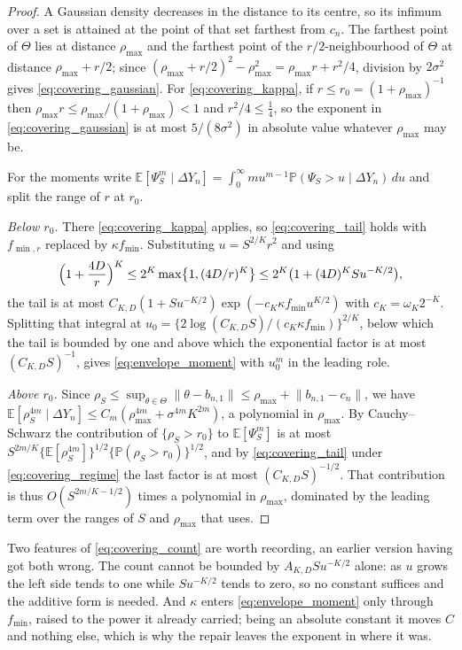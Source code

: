 \documentclass[11pt]{article}
\theoremstyle{definition}
\newcommand{\E}{\mathbb{E}}
\newcommand{\Pp}{\mathbb{P}}
\begin{document}
\begin{proof}
A Gaussian density decreases in the distance to its centre, so its infimum over a set is attained at the point of that set farthest from $c_n$. The farthest point of $\Theta$ lies at distance $\rho_{\max}$ and the farthest point of the $r/2$-neighbourhood of $\Theta$ at distance $\rho_{\max}+r/2$; since $(\rho_{\max}+r/2)^2-\rho_{\max}^2=\rho_{\max}r+r^2/4$, division by $2\sigma^2$ gives \eqref{eq:covering_gaussian}. For \eqref{eq:covering_kappa}, if $r\le r_0=(1+\rho_{\max})^{-1}$ then $\rho_{\max}r\le\rho_{\max}/(1+\rho_{\max})<1$ and $r^2/4\le\tfrac14$, so the exponent in \eqref{eq:covering_gaussian} is at most $5/(8\sigma^2)$ in absolute value whatever $\rho_{\max}$ may be.

For the moments write $\E[\Psi_S^m\mid\Delta Y_n]=\int_0^\infty mu^{m-1}\Pp(\Psi_S>u\mid\Delta Y_n)\,du$ and split the range of $r$ at $r_0$.

\emph{Below $r_0$.} There \eqref{eq:covering_kappa} applies, so \eqref{eq:covering_tail} holds with $f_{\min,r}$ replaced by $\kappa f_{\min}$. Substituting $u=S^{2/K}r^2$ and using
\begin{equation}\label{eq:covering_count}
\Bigl(1+\frac{4D}{r}\Bigr)^{K}\le 2^K\max\bigl\{1,(4D/r)^K\bigr\}\le 2^K\bigl(1+(4D)^KSu^{-K/2}\bigr),
\end{equation}
the tail is at most $C_{K,D}(1+Su^{-K/2})\exp(-c_K\kappa f_{\min}u^{K/2})$ with $c_K=\omega_K2^{-K}$. Splitting that integral at $u_0=\{2\log(C_{K,D}S)/(c_K\kappa f_{\min})\}^{2/K}$, below which the tail is bounded by one and above which the exponential factor is at most $(C_{K,D}S)^{-1}$, gives \eqref{eq:envelope_moment} with $u_0^m$ in the leading role.

\emph{Above $r_0$.} Since $\rho_S\le\sup_{\theta\in\Theta}\lVert\theta-b_{n,1}\rVert\le\rho_{\max}+\lVert b_{n,1}-c_n\rVert$, we have $\E[\rho_S^{4m}\mid\Delta Y_n]\le C_m(\rho_{\max}^{4m}+\sigma^{4m}K^{2m})$, a polynomial in $\rho_{\max}$. By Cauchy--Schwarz the contribution of $\{\rho_S>r_0\}$ to $\E[\Psi_S^m]$ is at most $S^{2m/K}\{\E[\rho_S^{4m}]\}^{1/2}\{\Pp(\rho_S>r_0)\}^{1/2}$, and by \eqref{eq:covering_tail} under \eqref{eq:covering_regime} the last factor is at most $(C_{K,D}S)^{-1/2}$. That contribution is thus $O(S^{2m/K-1/2})$ times a polynomial in $\rho_{\max}$, dominated by the leading term over the ranges of $S$ and $\rho_{\max}$ that  uses.
\end{proof}

Two features of \eqref{eq:covering_count} are worth recording, an earlier version having got both wrong. The count cannot be bounded by $A_{K,D}Su^{-K/2}$ alone: as $u$ grows the left side tends to one while $Su^{-K/2}$ tends to zero, so no constant suffices and the additive form is needed. And $\kappa$ enters \eqref{eq:envelope_moment} only through $f_{\min}$, raised to the power it already carried; being an absolute constant it moves $C$ and nothing else, which is why the repair leaves the exponent in  where it was.
\end{document}

